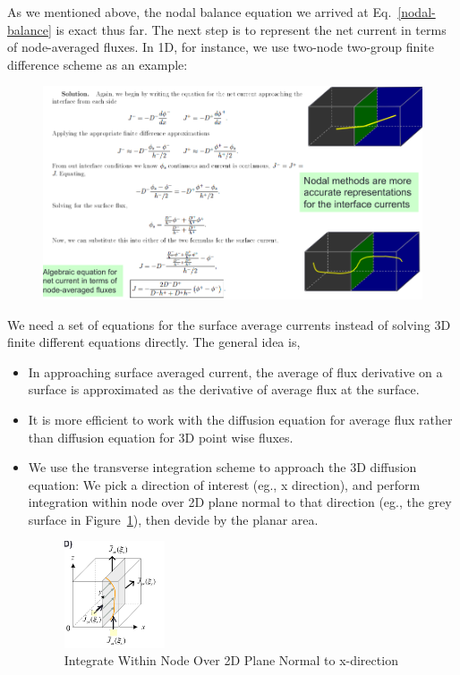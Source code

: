 \documentclass{school-22.211-notes}
\begin{document}
\clearpage
{}
As we mentioned above, the nodal balance equation we arrived at Eq.~\ref{nodal-balance} is exact thus far. The next step is to represent the net current in terms of node-averaged fluxes. In 1D, for instance, we use two-node two-group finite difference scheme as an example: 
\begin{figure}[h]
  \hspace{-1in}
  \includegraphics[width=1.2\textwidth]{images/methd/2node2g-finite-difference.png}
\end{figure}



\clearpage
{}
We need a set of equations for the surface average currents instead of solving 3D finite different equations directly. The general idea is, 
\begin{itemize}
\item In approaching surface averaged current, the average of flux derivative on a surface is approximated as the derivative of average flux at the surface. 

\item It is more efficient to work with the diffusion equation for average flux rather than diffusion equation for 3D point wise fluxes. 

\item We use the transverse integration scheme to approach the 3D diffusion equation: We pick a direction of interest (eg., x direction), and perform integration within node over 2D plane normal to that direction (eg., the grey surface in Figure~\ref{nodal-current}), then devide by the planar area. 
\begin{figure}[ht]
  \centering
  \includegraphics[width=0.28\textwidth]{images/methd/nodal-current.png}
  \caption{Integrate Within Node Over 2D Plane Normal to x-direction} \label{nodal-current}
\end{figure}
\end{itemize}
\end{document}
